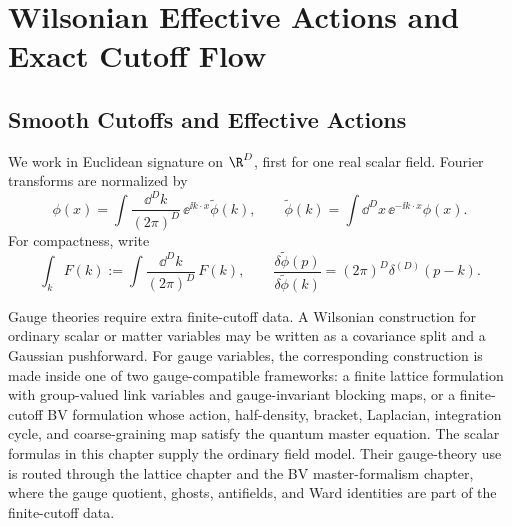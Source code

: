 \chapter{Wilsonian Effective Actions and Exact Cutoff Flow}
\label{ch:vol2-wilsonian-effective-actions}
\ConventionsEuclidean


\section{Smooth Cutoffs and Effective Actions}

We work in Euclidean signature on \(\R^D\), first for one real scalar field.
Fourier transforms are normalized by
\[
  \phi(x)=\int\frac{\dd^Dk}{(2\pi)^D}\,
  \ee^{\ii k\cdot x}\widetilde\phi(k),
  \qquad
  \widetilde\phi(k)=\int\dd^Dx\,\ee^{-\ii k\cdot x}\phi(x).
\]
For compactness, write
\[
  \int_k F(k):=\int\frac{\dd^Dk}{(2\pi)^D}\,F(k),
  \qquad
  \frac{\delta\widetilde\phi(p)}{\delta\widetilde\phi(k)}
  =(2\pi)^D\delta^{(D)}(p-k).
\]

Gauge theories require extra finite-cutoff data.  A Wilsonian construction for
ordinary scalar or matter variables may be written as a covariance split and a
Gaussian pushforward.  For gauge variables, the corresponding construction is
made inside one of two gauge-compatible frameworks: a finite lattice
formulation with group-valued link variables and gauge-invariant blocking
maps, or a finite-cutoff BV formulation whose action, half-density, bracket,
Laplacian, integration cycle, and coarse-graining map satisfy the quantum
master equation.  The scalar formulas in this chapter supply the ordinary
field model.  Their gauge-theory use is routed through the lattice chapter and
the BV master-formalism chapter, where the gauge quotient, ghosts,
antifields, and Ward identities are part of the finite-cutoff data.

